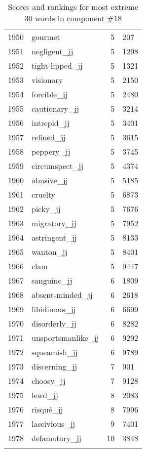 \begin{longtable}[!htbp]{| rlr@{.}l |}
    1950 & gourmet & 5 & 207 \\
    1951 & negligent\_jj & 5 & 1298 \\
    1952 & tight-lipped\_jj & 5 & 1321 \\
    1953 & visionary & 5 & 2150 \\
    1954 & forcible\_jj & 5 & 2480 \\
    1955 & cautionary\_jj & 5 & 3214 \\
    1956 & intrepid\_jj & 5 & 3401 \\
    1957 & refined\_jj & 5 & 3615 \\
    1958 & peppery\_jj & 5 & 3745 \\
    1959 & circumspect\_jj & 5 & 4374 \\
    1960 & abusive\_jj & 5 & 5185 \\
    1961 & cruelty & 5 & 6873 \\
    1962 & picky\_jj & 5 & 7676 \\
    1963 & migratory\_jj & 5 & 7952 \\
    1964 & astringent\_jj & 5 & 8133 \\
    1965 & wanton\_jj & 5 & 8401 \\
    1966 & clam & 5 & 9447 \\
    1967 & sanguine\_jj & 6 & 1809 \\
    1968 & absent-minded\_jj & 6 & 2618 \\
    1969 & libidinous\_jj & 6 & 6699 \\
    1970 & disorderly\_jj & 6 & 8282 \\
    1971 & unsportsmanlike\_jj & 6 & 9292 \\
    1972 & squeamish\_jj & 6 & 9789 \\
    1973 & discerning\_jj & 7 & 901 \\
    1974 & choosy\_jj & 7 & 9128 \\
    1975 & lewd\_jj & 8 & 2083 \\
    1976 & risqué\_jj & 8 & 7996 \\
    1977 & lascivious\_jj & 9 & 7401 \\
    1978 & defamatory\_jj & 10 & 3848 \\
    \hline
    \caption{Scores and rankings for most extreme 30 words in component \#18} \\
\end{longtable}

